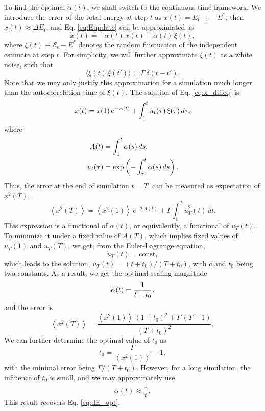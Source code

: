\documentclass[reprint]{revtex4-1}
\begin{document}
To find the optimal $\alpha(t)$,
we shall switch to the continuous-time framework.
%
We introduce the error of the total energy at step $t$ as
$x(t) = E_{t-1} - E^*$,
then $\dot x(t) \approx \Delta E_t$,
and Eq. \eqref{eq:Eupdate} can be approximated as
%
\begin{equation}
  \dot x(t)
  =
  -\alpha(t) \, x(t) + \alpha(t) \, \xi(t)
  ,
  \label{eq:x_diffeq}
\end{equation}
%
where $\xi(t) \equiv \mathcal E_t - E^*$
denotes the random fluctuation of the independent estimate at step $t$.
%
For simplicity, we will further approximate $\xi(t)$ as a white noise,
such that
\begin{equation}
  \langle \xi(t) \, \xi(t') \rangle = \Gamma \, \delta(t - t').
  \label{eq:noise_corr}
\end{equation}
%
Note that we may only justify this approximation
for a simulation much longer than the autocorrelation time of $\xi(t)$.
%
The solution of Eq. \eqref{eq:x_diffeq} is
%
\begin{equation}
  x(t)
  =
  x(1) \, e^{ -A(t) }
  +
  \int_1^t \dot u_t(\tau) \, \xi(\tau) \, d\tau
  ,
  \notag
\end{equation}
%
where
\begin{align*}
  A(t)
  &=
  \int_1^t \alpha(s) \, ds
  ,
\\
  u_t(\tau)
  &= \exp\left(
    -\int_\tau^t \alpha(s) \, ds
  \right)
  .
  \notag
\end{align*}
%
Thus, the error at the end of simulation $t = T$,
can be measured as expectation of $x^2(T)$,
%
\begin{equation}
  \left\langle
    x^2(T)
  \right\rangle
  =
  \left\langle
    x^2(1)
  \right\rangle
  \, e^{ -2 \, A(t) }
  +
  \Gamma
  \int_1^T
    \dot u_T^2(t) \, dt
  .
  \label{eq:err_functional}
\end{equation}
%
%
This expression is a functional of $\alpha(t)$,
or equivalently, a functional of $u_T(t)$.
%
To minimize it under a fixed value of $A(T)$,
which implies fixed values of $u_T(1)$ and $u_T(T)$,
we get, from the Euler-Lagrange equation, 
$$
\dot u_T(t) = \mathrm{const},
$$
which leads to the solution,
$u_T(t) = (t + t_0) / (T + t_0)$,
with $c$ and $t_0$ being two constants.
%
As a result, we get the optimal scaling magnitude
%
\begin{equation}
  \alpha(t) = \frac{ 1 } { t + t_0 }
  ,
  \notag
\end{equation}
%
and the error is
%
$$%
  \left\langle
    x^2(T)
  \right\rangle
  =
  \frac{
    \left\langle x^2(1) \right\rangle
    \, (1 + t_0)^2
    + \Gamma \, (T - 1)
  }
  {
    (T + t_0)^2
  }
  ,
$$%
%
We can further determine the optimal value of $t_0$ as
$$
t_0 = \frac{ \Gamma } { \left\langle x^2(1) \right\rangle } - 1,
$$
%
with the minimal error being $\Gamma / (T + t_0)$.
%
However, for a long simulation, the influence of $t_0$
is small, and we may approximately use
$$
\alpha(t) \approx \frac 1 t,
$$
This result recovers Eq. \eqref{eq:dE_opt}.
\end{document}
